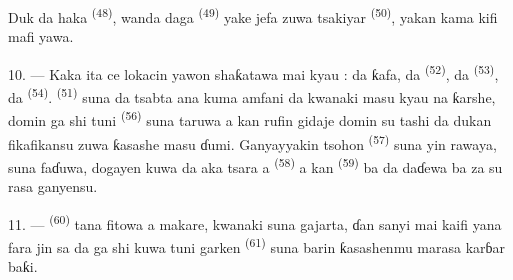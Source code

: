 Duk da haka  \textsuperscript{(48)}, wanda daga
 \textsuperscript{(49)} yake jefa 
zuwa tsakiyar  \textsuperscript{(50)}, yakan kama kifi mafi
yawa.

10. --- Kaka ita ce lokacin yawon shaƙatawa mai kyau : da ƙafa, da
 \textsuperscript{(52)}, da 
\textsuperscript{(53)}, da  \textsuperscript{(54)}.
 \textsuperscript{(51)} suna da tsabta ana kuma amfani
da kwanaki masu kyau na ƙarshe, domin ga shi tuni 
\textsuperscript{(56)} suna taruwa a kan rufin gidaje domin su tashi da
dukan fikafikansu zuwa ƙasashe masu ɗumi. Ganyayyakin tsohon
 \textsuperscript{(57)} suna yin rawaya,
 suna faɗuwa, dogayen  kuwa da aka
tsara a  \textsuperscript{(58)} a kan 
\textsuperscript{(59)} ba da daɗewa ba za su rasa ganyensu.

11. ---  \textsuperscript{(60)} tana fitowa a makare,
kwanaki suna gajarta, ɗan sanyi mai kaifi yana fara jin sa da
 ga shi kuwa tuni garken 
\textsuperscript{(61)} suna barin ƙasashenmu marasa karɓar baƙi.

\VUsaut{6.0mm}
\VUfilet{22mm}
